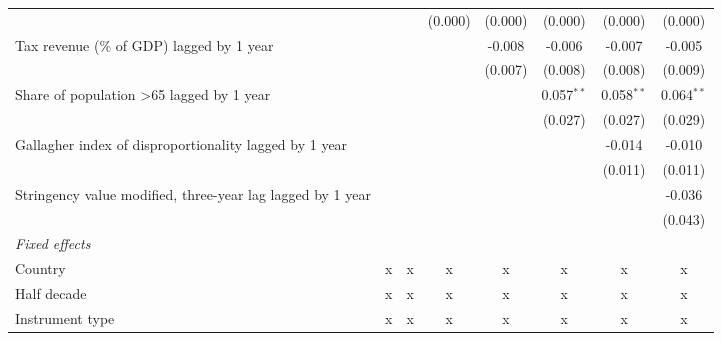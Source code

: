 \begin{tabular}{lccccccc}
                                                                                                 &         &         & (0.000) & (0.000)     & (0.000)       & (0.000)      & (0.000)\\   
   Tax revenue (\% of GDP) lagged by 1 year                                                      &         &         &         & -0.008      & -0.006        & -0.007       & -0.005\\   
                                                                                                 &         &         &         & (0.007)     & (0.008)       & (0.008)      & (0.009)\\   
   Share of population >65 lagged by 1 year                                                      &         &         &         &             & 0.057$^{**}$  & 0.058$^{**}$ & 0.064$^{**}$\\   
                                                                                                 &         &         &         &             & (0.027)       & (0.027)      & (0.029)\\   
   Gallagher index of disproportionality lagged by 1 year                                        &         &         &         &             &               & -0.014       & -0.010\\   
                                                                                                 &         &         &         &             &               & (0.011)      & (0.011)\\   
   Stringency value modified, three-year lag lagged by 1 year                                    &         &         &         &             &               &              & -0.036\\   
                                                                                                 &         &         &         &             &               &              & (0.043)\\   
   \emph{Fixed effects}\\
   Country                                                                                       & x       & x       & x       & x           & x             & x            & x\\  
   Half decade                                                                                   & x       & x       & x       & x           & x             & x            & x\\  
   Instrument type                                                                               & x       & x       & x       & x           & x             & x            & x\\  

\end{tabular}

